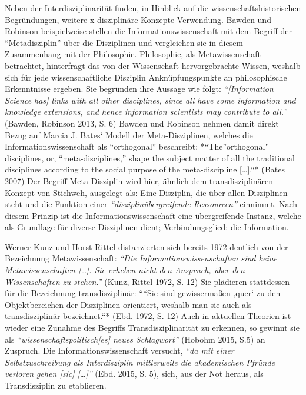 \documentclass[a4paper,
fontsize=11pt,
oneside,
numbers=noperiodatend,
parskip=half-,
bibliography=totoc,
final
]{scrartcl}
\begin{document}
Neben der Interdisziplinarität finden, in Hinblick auf die
wissenschaftshistorischen Begründungen, weitere x-disziplinäre Konzepte
Verwendung. Bawden und Robinson beispielweise stellen die
Informationswissenschaft mit dem Begriff der \enquote{Metadisziplin}
über die Disziplinen und vergleichen sie in diesem Zusammenhang mit der
Philosophie. Philosophie, als Metawissenschaft betrachtet, hinterfragt
das von der Wissenschaft hervorgebrachte Wissen, weshalb sich für jede
wissenschaftliche Disziplin Anknüpfungspunkte an philosophische
Erkenntnisse ergeben. Sie begründen ihre Aussage wie folgt:
\emph{\enquote{{[}Information Science has{]} links with all other
disciplines, since all have some information and knowledge extensions,
and hence information scientists may contribute to all.}} (Bawden,
Robinson 2013, S. 6) Bawden und Robinson nehmen damit direkt Bezug auf
Marcia J. Bates` Modell der Meta-Disziplinen, welches die
Informationswissenschaft als \enquote{orthogonal} beschreibt:
*\enquote{The}orthogonal" disciplines, or, \enquote{meta-disciplines,}
shape the subject matter of all the traditional disciplines according to
the social purpose of the meta-discipline {[}\ldots{}{]}.``* (Bates
2007) Der Begriff Meta-Disziplin wird hier, ähnlich dem
transdisziplinären Konzept von Stichweh, ausgelegt als: Eine Disziplin,
die über allen Disziplinen steht und die Funktion einer
\emph{\enquote{disziplinübergreifende Ressourcen}} einnimmt. Nach diesem
Prinzip ist die Informationswissenschaft eine übergreifende Instanz,
welche als Grundlage für diverse Disziplinen dient; Verbindungsglied:
die Information.

Werner Kunz und Horst Rittel distanzierten sich bereits 1972 deutlich
von der Bezeichnung Metawissenschaft: \emph{\enquote{Die
Informationswissenschaften sind keine Metawissenschaften {[}\ldots{}{]}.
Sie erheben nicht den Anspruch, über den Wissenschaften zu stehen.}}
(Kunz, Rittel 1972, S. 12) Sie plädieren stattdessen für die Bezeichnung
transdisziplinär: ``*Sie sind gewissermaßen ‚quer` zu den
Objektbereichen der Disziplinen orientiert, weshalb man sie auch als
transdisziplinär bezeichnet.``* (Ebd. 1972, S. 12) Auch in aktuellen
Theorien ist wieder eine Zunahme des Begriffs Transdisziplinarität zu
erkennen, so gewinnt sie als
\emph{\enquote{wissenschaftspolitisch{[}es{]} neues Schlagwort}} (Hobohm
2015, S.5) an Zuspruch. Die Informationswissenschaft versucht,
\emph{\enquote{da mit einer Selbstzuschreibung als Interdisziplin
mittlerweile die akademischen Pfründe verloren gehen {[}sic{]}
{[}\ldots{}{]}}} (Ebd. 2015, S. 5), sich, aus der Not heraus, als
Transdisziplin zu etablieren.
\end{document}
